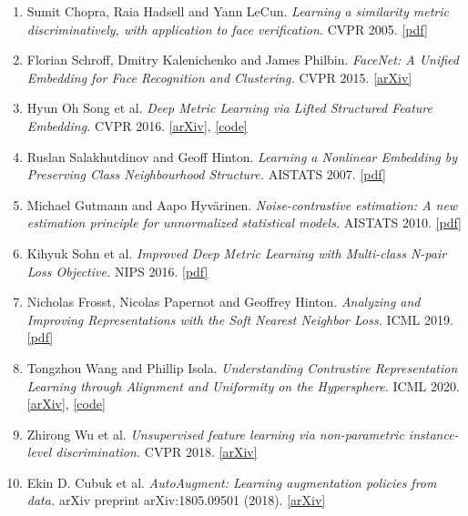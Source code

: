 \documentclass[12pt]{article}
\begin{document}
\begin{enumerate}
    \item Sumit Chopra, Raia Hadsell and Yann LeCun. \textit{Learning a similarity metric discriminatively, with application to face verification.} CVPR 2005. \href{http://yann.lecun.com/exdb/publis/pdf/chopra-05.pdf}{[pdf]}
    \item Florian Schroff, Dmitry Kalenichenko and James Philbin. \textit{FaceNet: A Unified Embedding for Face Recognition and Clustering.} CVPR 2015. \href{https://arxiv.org/abs/1503.03832}{[arXiv]}
    \item Hyun Oh Song et al. \textit{Deep Metric Learning via Lifted Structured Feature Embedding.} CVPR 2016. \href{https://arxiv.org/abs/1511.06452}{[arXiv]}, \href{https://github.com/rksltnl/Deep-Metric-Learning-CVPR16}{[code]}
    \item Ruslan Salakhutdinov and Geoff Hinton. \textit{Learning a Nonlinear Embedding by Preserving Class Neighbourhood Structure.} AISTATS 2007. \href{http://proceedings.mlr.press/v2/salakhutdinov07a.html}{[pdf]}
    \item Michael Gutmann and Aapo Hyvärinen. \textit{Noise-contrastive estimation: A new estimation principle for unnormalized statistical models.} AISTATS 2010. \href{http://proceedings.mlr.press/v9/gutmann10a.html}{[pdf]}
    \item Kihyuk Sohn et al. \textit{Improved Deep Metric Learning with Multi-class N-pair Loss Objective.} NIPS 2016. \href{https://papers.nips.cc/paper/2016/hash/6b180037abbebea991d8b1232f8a8ca9-Abstract.html}{[pdf]}
    \item Nicholas Frosst, Nicolas Papernot and Geoffrey Hinton. \textit{Analyzing and Improving Representations with the Soft Nearest Neighbor Loss.} ICML 2019. \href{http://proceedings.mlr.press/v97/frosst19a.html}{[pdf]}
    \item Tongzhou Wang and Phillip Isola. \textit{Understanding Contrastive Representation Learning through Alignment and Uniformity on the Hypersphere.} ICML 2020. \href{https://arxiv.org/abs/2005.10242}{[arXiv]}, \href{https://ssnl.github.io/hypersphere/}{[code]}
    \item Zhirong Wu et al. \textit{Unsupervised feature learning via non-parametric instance-level discrimination.} CVPR 2018. \href{https://arxiv.org/abs/1805.01978}{[arXiv]}
    \item Ekin D. Cubuk et al. \textit{AutoAugment: Learning augmentation policies from data.} arXiv preprint arXiv:1805.09501 (2018). \href{https://arxiv.org/abs/1805.09501}{[arXiv]}

\end{enumerate}
\end{document}
